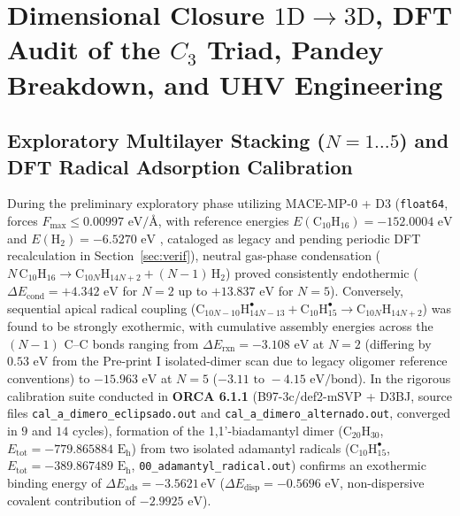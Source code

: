 \documentclass[10pt,twocolumn,a4paper]{article}
\begin{document}
\section{Dimensional Closure $1\text{D} \to 3\text{D}$, DFT Audit of the $C_3$ Triad, Pandey Breakdown, and UHV Engineering}

\subsection{Exploratory Multilayer Stacking ($N=1\dots5$) and DFT Radical Adsorption Calibration}
During the preliminary exploratory phase utilizing MACE-MP-0 + D3 (\texttt{float64}, forces $F_{\text{max}} \le 0.00997\text{ eV/\AA}$, with reference energies $E(\text{C}_{10}\text{H}_{16}) = -152.0004\text{ eV}$ and $E(\text{H}_2) = -6.5270\text{ eV}$ \cite{Batatia2024,Grimme2010}, cataloged as legacy and pending periodic DFT recalculation in Section~\ref{sec:verif}), neutral gas-phase condensation ($N\,\text{C}_{10}\text{H}_{16} \to \text{C}_{10N}\text{H}_{14N+2} + (N-1)\,\text{H}_2$) proved consistently endothermic ($\Delta E_{\text{cond}} = +4.342\text{ eV}$ for $N=2$ up to $+13.837\text{ eV}$ for $N=5$). Conversely, sequential apical radical coupling ($\text{C}_{10N-10}\text{H}_{14N-13}^\bullet + \text{C}_{10}\text{H}_{15}^\bullet \to \text{C}_{10N}\text{H}_{14N+2}$) was found to be strongly exothermic, with cumulative assembly energies across the $(N-1)$ $\text{C--C}$ bonds ranging from $\Delta E_{\text{rxn}} = -3.108\text{ eV}$ at $N=2$ (differing by $0.53\text{ eV}$ from the Pre-print I isolated-dimer scan due to legacy oligomer reference conventions) to $-15.963\text{ eV}$ at $N=5$ ($-3.11\text{ to }-4.15\text{ eV/bond}$). In the rigorous calibration suite conducted in \textbf{ORCA 6.1.1} (B97-3c/def2-mSVP + D3BJ, source files \texttt{cal\_a\_dimero\_eclipsado.out} and \texttt{cal\_a\_dimero\_alternado.out}, converged in $9$ and $14$ cycles), formation of the 1,1'-biadamantyl dimer ($\text{C}_{20}\text{H}_{30}$, $E_{\text{tot}} = -779.865884\text{ E}_\text{h}$) from two isolated adamantyl radicals ($\text{C}_{10}\text{H}_{15}^\bullet$, $E_{\text{tot}} = -389.867489\text{ E}_\text{h}$, \texttt{00\_adamantyl\_radical.out}) confirms an exothermic binding energy of $\Delta E_{\text{ads}} = \mathbf{-3.5621}\,\text{eV}$ ($\Delta E_{\text{disp}} = -0.5696\text{ eV}$, non-dispersive covalent contribution of $-2.9925\text{ eV}$).
\end{document}
